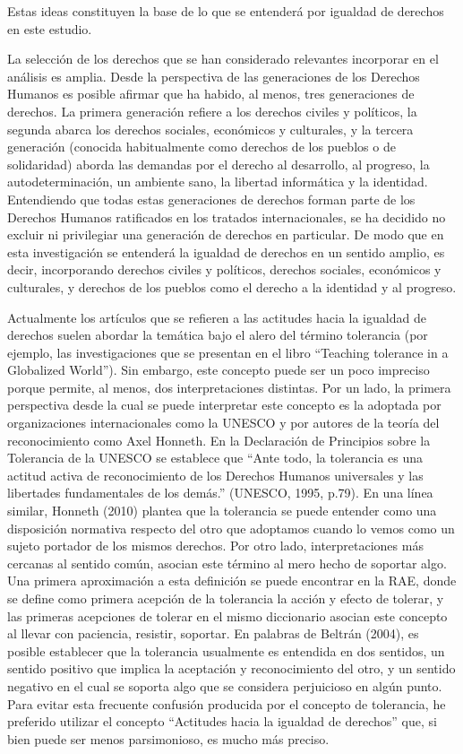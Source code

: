 \documentclass[12pt,twoside]{templates/facsothesis}
\begin{document}
Estas ideas constituyen la base de lo que se entenderá por igualdad de derechos en este estudio.

La selección de los derechos que se han considerado relevantes incorporar en el análisis es amplia. Desde la perspectiva de las generaciones de los Derechos Humanos es posible afirmar que ha habido, al menos, tres generaciones de derechos. La primera generación refiere a los derechos civiles y políticos, la segunda abarca los derechos sociales, económicos y culturales, y la tercera generación (conocida habitualmente como derechos de los pueblos o de solidaridad) aborda las demandas por el derecho al desarrollo, al progreso, la autodeterminación, un ambiente sano, la libertad informática y la identidad. Entendiendo que todas estas generaciones de derechos forman parte de los Derechos Humanos ratificados en los tratados internacionales, se ha decidido no excluir ni privilegiar una generación de derechos en particular. De modo que en esta investigación se entenderá la igualdad de derechos en un sentido amplio, es decir, incorporando derechos civiles y políticos, derechos sociales, económicos y culturales, y derechos de los pueblos como el derecho a la identidad y al progreso.

Actualmente los artículos que se refieren a las actitudes hacia la igualdad de derechos suelen abordar la temática bajo el alero del término tolerancia (por ejemplo, las investigaciones que se presentan en el libro ``Teaching tolerance in a Globalized World''). Sin embargo, este concepto puede ser un poco impreciso porque permite, al menos, dos interpretaciones distintas. Por un lado, la primera perspectiva desde la cual se puede interpretar este concepto es la adoptada por organizaciones internacionales como la UNESCO y por autores de la teoría del reconocimiento como Axel Honneth. En la Declaración de Principios sobre la Tolerancia de la UNESCO se establece que ``Ante todo, la tolerancia es una actitud activa de reconocimiento de los Derechos Humanos universales y las libertades fundamentales de los demás.'' (UNESCO, 1995, p.79). En una línea similar, Honneth (2010) plantea que la tolerancia se puede entender como una disposición normativa respecto del otro que adoptamos cuando lo vemos como un sujeto portador de los mismos derechos. Por otro lado, interpretaciones más cercanas al sentido común, asocian este término al mero hecho de soportar algo. Una primera aproximación a esta definición se puede encontrar en la RAE, donde se define como primera acepción de la tolerancia la acción y efecto de tolerar, y las primeras acepciones de tolerar en el mismo diccionario asocian este concepto al llevar con paciencia, resistir, soportar. En palabras de Beltrán (2004), es posible establecer que la tolerancia usualmente es entendida en dos sentidos, un sentido positivo que implica la aceptación y reconocimiento del otro, y un sentido negativo en el cual se soporta algo que se considera perjuicioso en algún punto. Para evitar esta frecuente confusión producida por el concepto de tolerancia, he preferido utilizar el concepto ``Actitudes hacia la igualdad de derechos'' que, si bien puede ser menos parsimonioso, es mucho más preciso.
\end{document}
